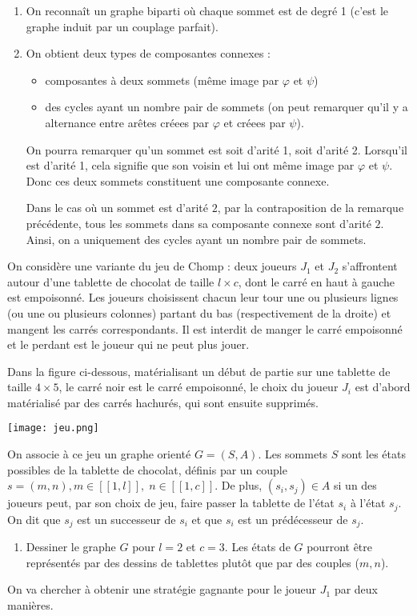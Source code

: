 \documentclass{ccinp}
\begin{document}
\begin{enumerate}
    \item On reconnaît un graphe biparti où chaque sommet est de degré 1 (c'est le graphe induit par un couplage parfait).
    \item On obtient deux types de composantes connexes :
         \begin{itemize}
             \item composantes à deux sommets (même image par $\varphi$ et  $\psi$)
             \item des cycles ayant un nombre pair de sommets (on peut remarquer qu'il y a alternance entre arêtes créees par $\varphi$ et créees par $\psi$).
         \end{itemize}
On pourra remarquer qu'un sommet est soit d'arité 1, soit d'arité 2. Lorsqu'il est d'arité 1, cela signifie que son voisin et lui ont même image par $\varphi$ et $\psi$. Donc ces deux sommets constituent une composante connexe.

Dans le cas où un sommet est d'arité $2$, par la contraposition de la remarque précédente, tous les sommets dans sa composante connexe sont d'arité $2$. Ainsi, on a uniquement des cycles ayant un nombre pair de sommets.

\end{enumerate}


\newpage


On considère une variante du jeu de Chomp : deux joueurs $J_1$ et $J_2$ s'affrontent autour d'une tablette de chocolat de taille $l\times c$, dont le carré en haut à gauche est empoisonné. Les joueurs choisissent chacun leur tour une ou plusieurs lignes (ou une ou plusieurs colonnes) partant du bas (respectivement de la droite) et mangent les carrés correspondants. Il est interdit de manger le carré empoisonné et le
perdant est le joueur qui ne peut plus jouer.

Dans la figure ci-dessous, matérialisant un début de partie sur une tablette de taille $4\times 5$, le carré noir est le carré empoisonné, le choix du joueur $J_i$ est d'abord matérialisé par des carrés hachurés, qui sont  ensuite supprimés.


\begin{center}
\texttt{[image: jeu.png]}

\end{center}

On associe à ce jeu un graphe orienté $G=(S,A)$. Les sommets $S$ sont les états possibles de la tablette de chocolat, définis par un couple $s = (m,n), m\in[\![1,l]\!],\; n\in[\![1,c]\!]$. De plus, $(s_i,s_j)\in A$ si un des joueurs peut, par son choix de jeu, faire passer la tablette de l'état $s_i$ à l'état $s_j$. On dit que $s_j$ est un successeur de $s_i$ et que $s_i$ est un prédécesseur de $s_j$.
    \begin{enumerate}
      \item Dessiner le graphe $G$ pour $l=2$ et $c=3$. Les états de $G$ pourront être représentés par des dessins de tablettes plutôt que par des couples ($m,n$).
    \end{enumerate}
On va chercher à obtenir une stratégie gagnante pour le joueur $J_1$ par deux manières. 
\end{document}
